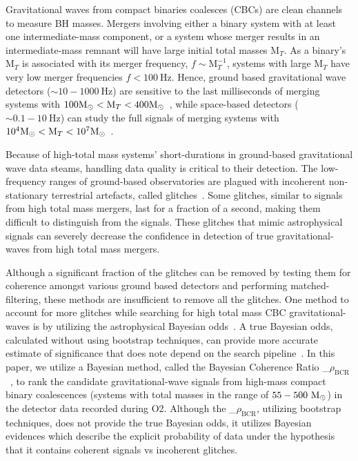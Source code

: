 \documentclass[%
 nofootinbib,
 amsmath,amssymb,
 aps,
 twocolumn
]{revtex4-2}
\newcommand{\mathcmd}[1]{{\sc \relax\ifmmode#1\else $#1$\fi}\xspace}
\newcommand{\bcr}{\mathcmd{\rho_\text{BCR}}}
\newcommand{\msun}{\mathcmd{\text{M}_\odot}}
\begin{document}
Gravitational waves from compact binaries coalesces (CBCs) are clean channels to measure BH masses. Mergers involving either a binary system with at least one intermediate-mass component, or a system whose merger results in an intermediate-mass remnant will have large initial total masses $\text{M}_{T}$. As a binary's $\text{M}_{T}$ is associated with its merger frequency, $f\sim \text{M}_{T}^{-1}$, systems with large $\text{M}_{T}$ have very low merger frequencies $f < 100\ \text{Hz}$. Hence, ground based gravitational wave detectors ($\sim 10 - 1000\ \text{Hz}$) are sensitive to the last milliseconds of merging systems with $100 \msun < \text{M}_{T} < 400 \msun$~\cite{}, while space-based detectors ($\sim 0.1 - 10\ \text{Hz}$) can study the full signals of merging systems with $10^4 \msun < \text{M}_{T} < 10^7 \msun$~\cite{}. 

Because of high-total mass systems' short-durations in ground-based gravitational wave data steams, handling data quality is critical to their detection. The low-frequency ranges of ground-based observatories are plagued with incoherent non-stationary terrestrial artefacts, called glitches~\cite{ pycbc_short_duration_transients, pe_with_glitch, blip_glitches}. Some glitches, similar to signals from high total mass mergers, last for a fraction of a second, making them difficult to distinguish from the signals. These glitches that mimic astrophysical signals can severely decrease the confidence in detection of true gravitational-waves from high total mass mergers. 

Although a significant fraction of the glitches can be removed by testing them for coherence amongst various ground based detectors and performing matched-filtering, these methods are insufficient to remove all the glitches. One method to account for more glitches while searching for high total mass CBC gravitational-waves is by utilizing the astrophysical Bayesian odds~\cite{bci, BCR1, BCR2, bcr_gw151216, bayesian_odds}. A true Bayesian odds, calculated without using bootstrap techniques, can provide more accurate estimate of significance that does note depend on the search pipeline~\cite{BCR2, bcr_gw151216,  bayesian_odds}. In this paper, we utilize a Bayesian method, called the Bayesian Coherence Ratio \bcr~\cite{BCR1}, to rank the candidate gravitational-wave signals from high-mass compact binary coalescences (systems with total masses in the range of $55-500\ \msun$) in the detector data recorded during O2. Although the \bcr, utilizing bootstrap techniques, does not provide the true Bayesian odds,  it utilizes Bayesian evidences which describe the explicit probability of data under the hypothesis that it contains coherent signals vs incoherent glitches.
\end{document}
